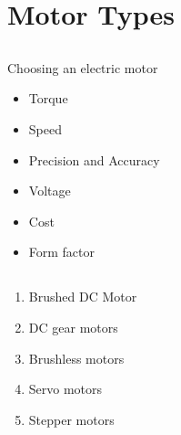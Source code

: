 \section{Motor Types}


\subsection{}
{
\begin{frame}{Choosing an electric motor}

\begin{itemize}
\item Torque
\item Speed
\item Precision and Accuracy
\item Voltage
\item Cost
\item Form factor
\end{itemize}

\end{frame}
}


\subsection{}
{
\begin{frame}{}

\begin{enumerate}
\item Brushed DC Motor
\item DC gear motors
\item Brushless motors
\item Servo motors
\item Stepper motors 
\end{enumerate}

\end{frame}
}





